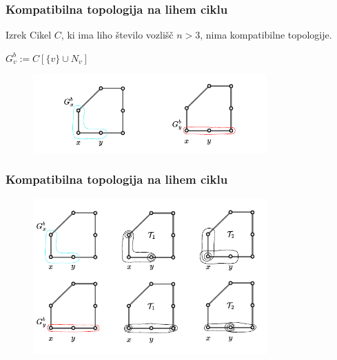 \documentclass{beamer}
\begin{document}
\begin{frame}[t]
    \frametitle{Kompatibilna topologija na lihem ciklu}
    \begin{block}{Izrek}
    Cikel $C$, ki ima liho število vozlišč $n > 3$, nima kompatibilne topologije.
    \end{block}
    \vspace{1cm}
    $G_v^b := C[\{v\} \cup N_v]$
    \begin{figure}[h]
        \begin{center}
        \includegraphics[width=0.8\textwidth]{odd-circle-gb.pdf}
        \end{center}
    \end{figure}
\end{frame}
\begin{frame}[t]
    \frametitle{Kompatibilna topologija na lihem ciklu}
    \begin{figure}[h]
        \begin{center}
        \includegraphics[width=0.8\textwidth]{odd-circle-t1-t2-big.pdf}
        \end{center}
    \end{figure}
\end{frame}
\end{document}
